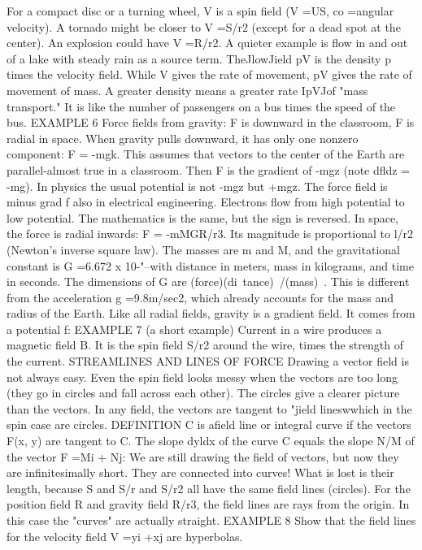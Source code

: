 {For a compact disc or a turning wheel, V is a spin field (V =US, co =angular
velocity). A tornado might be closer to V =S/r2 (except for a dead spot at the center).
An explosion could have V =R/r2. A quieter example is flow in and out of a lake
with steady rain as a source term.
TheJlowJield pV is the density p times the velocity field. While V gives the rate of
movement, pV gives the rate of movement of mass. A greater density means a greater
rate IpVJof "mass transport." It is like the number of passengers on a bus times the
speed of the bus.
EXAMPLE 6 Force fields from gravity: F is downward in the classroom, F is radial
in space.
When gravity pulls downward, it has only one nonzero component: F = -mgk. This
assumes that vectors to the center of the Earth are parallel-almost true in a classroom.
Then F is the gradient of -mgz (note dfldz = -mg).
In physics the usual potential is not -mgz but +mgz. The force field is minus grad f
also in electrical engineering. Electrons flow from high potential to low potential.
The mathematics is the same, but the sign is reversed.
In space, the force is radial inwards: F = -mMGR/r3. Its magnitude is proportional
to l/r2 (Newton's inverse square law). The masses are m and M, and the
gravitational constant is G =6.672 x 10-"--with distance in meters, mass in kilograms,
and time in seconds. The dimensions of G are (force)(di~tance)~/(mass)~. This
is different from the acceleration g =9.8m/sec2, which already accounts for the mass
and radius of the Earth.
Like all radial fields, gravity is a gradient field. It comes from a potential f:
EXAMPLE 7 (a short example) Current in a wire produces a magnetic field B. It is
the spin field S/r2 around the wire, times the strength of the current.
STREAMLINES AND LINES OF FORCE
Drawing a vector field is not always easy. Even the spin field looks messy when the
vectors are too long (they go in circles and fall across each other). The circles give a
clearer picture than the vectors. In any field, the vectors are tangent to "jield lineswwhich
in the spin case are circles.
DEFINITION C is afield line or integral curve if the vectors F(x, y) are tangent to C.
The slope dyldx of the curve C equals the slope N/M of the vector F =Mi + Nj:
We are still drawing the field of vectors, but now they are infinitesimally short.
They are connected into curves! What is lost is their length, because S and S/r and
S/r2 all have the same field lines (circles). For the position field R and gravity field
R/r3, the field lines are rays from the origin. In this case the "curves" are actually
straight.
EXAMPLE 8 Show that the field lines for the velocity field V =yi +xj are hyperbolas.
}
